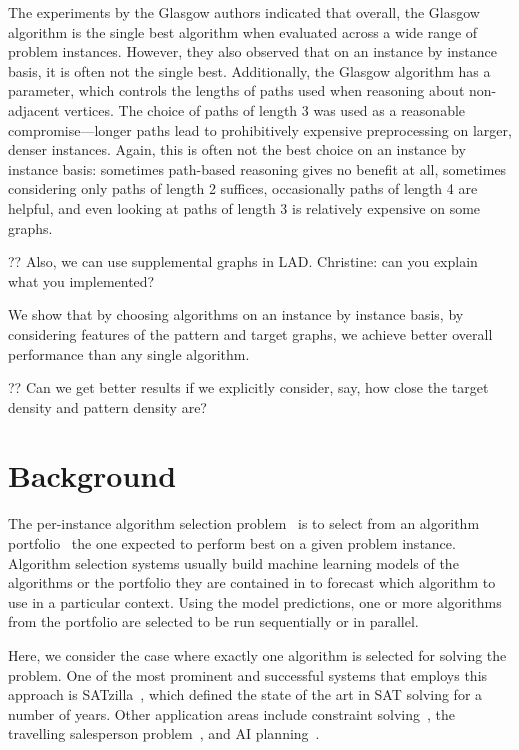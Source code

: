 \documentclass{llncs}
\begin{document}
\noindent The experiments by the Glasgow authors indicated that overall, the Glasgow algorithm is
the single best algorithm when evaluated across a wide range of problem instances. However, they
also observed that on an instance by instance basis, it is often not the single best.  Additionally,
the Glasgow algorithm has a parameter, which controls the lengths of paths used when reasoning about
non-adjacent vertices.  The choice of paths of length 3 was used as a reasonable compromise---longer
paths lead to prohibitively expensive preprocessing on larger, denser instances. Again, this is
often not the best choice on an instance by instance basis: sometimes path-based reasoning gives no
benefit at all, sometimes considering only paths of length 2 suffices, occasionally paths of
length 4 are helpful, and even looking at paths of length 3 is relatively expensive on some graphs.

?? Also, we can use supplemental graphs in LAD. Christine: can you explain what you implemented?

We show that by choosing algorithms on an instance by instance basis, by
considering features of the pattern and target graphs, we achieve better overall
performance than any single algorithm.

?? Can we get better results if we explicitly consider, say, how close the target density and
pattern density are?

\section{Background}


The per-instance algorithm selection problem~\cite{rice_algorithm_1976} is to
select from an algorithm
portfolio~\cite{huberman_economics_1997,gomes_algorithm_2001} the one expected
to perform best on a given problem instance. Algorithm selection systems usually
build machine learning models of the algorithms or the portfolio they are
contained in to forecast which algorithm to use in a particular context. Using
the model predictions, one or more algorithms from the portfolio are selected to
be run sequentially or in parallel.

Here, we consider the case where exactly one algorithm is selected for
solving the problem. One of the most prominent and successful systems that
employs this approach is SATzilla~\cite{xu_satzilla_2008}, which defined the
state of the art in SAT solving for a number of years. Other application areas
include constraint solving~\cite{omahony_using_2008},
the travelling salesperson problem~\cite{kotthoff_improving_2015},
and AI planning~\cite{seipp_learning_2012}.
\end{document}
